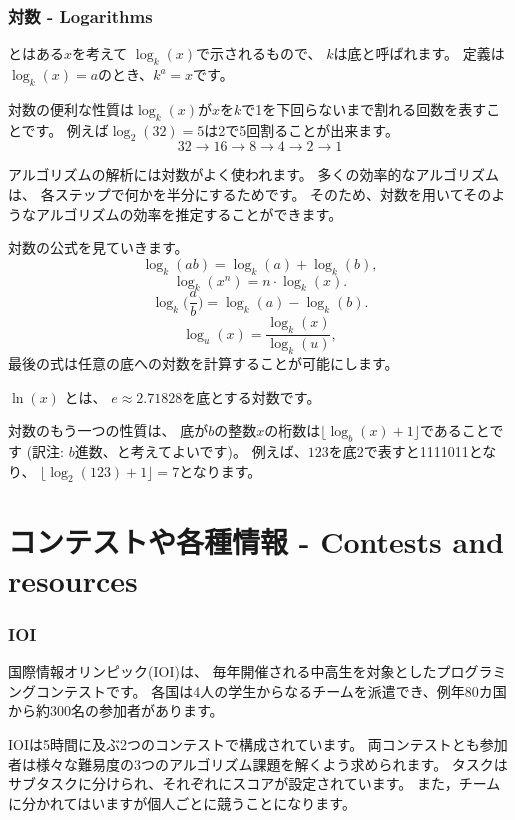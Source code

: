 \subsubsection{対数 - Logarithms}


とはある$x$を考えて
$\log_k(x)$で示されるもので、
$k$は底と呼ばれます。
定義は$\log_k(x)=a$のとき、$k^a=x$です。

対数の便利な性質は$\log_k(x)$が$x$を$k$で1を下回らないまで割れる回数を表すことです。
例えば$\log_2(32)=5$は2で5回割ることが出来ます。
\[32 \rightarrow 16 \rightarrow 8 \rightarrow 4 \rightarrow 2 \rightarrow 1 \]

アルゴリズムの解析には対数がよく使われます。
多くの効率的なアルゴリズムは、
各ステップで何かを半分にするためです。
そのため、対数を用いてそのようなアルゴリズムの効率を推定することができます。

対数の公式を見ていきます。
\[\log_k(ab) = \log_k(a)+\log_k(b),\]
\[\log_k(x^n) = n \cdot \log_k(x).\]
\[\log_k\Big(\frac{a}{b}\Big) = \log_k(a)-\log_k(b).\]
\[\log_u(x) = \frac{\log_k(x)}{\log_k(u)},\]
最後の式は任意の底への対数を計算することが可能にします。



 $\ln(x)$ とは、
$e \approx 2.71828$を底とする対数です。

対数のもう一つの性質は、
底が$b$の整数$x$の桁数は$\lfloor \log_b(x)+1 \rfloor$であることです
(訳注: $b$進数、と考えてよいです)。
例えば、$123$を底$2$で表すと1111011となり、
$\lfloor \log_2(123)+1 \rfloor = 7$となります。

\section{コンテストや各種情報 - Contests and resources}

\subsubsection{IOI}

国際情報オリンピック(IOI)は、
毎年開催される中高生を対象としたプログラミングコンテストです。
各国は4人の学生からなるチームを派遣でき、例年80カ国から約300名の参加者があります。

IOIは5時間に及ぶ2つのコンテストで構成されています。
両コンテストとも参加者は様々な難易度の3つのアルゴリズム課題を解くよう求められます。
タスクはサブタスクに分けられ、それぞれにスコアが設定されています。
また，チームに分かれてはいますが個人ごとに競うことになります。

